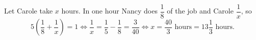 Let Carole take $x$ hours. In one hour Nancy does $\dfrac{1}{8}$ of the job and Carole $\dfrac{1}{x}$, so
\[
5\left(\dfrac{1}{8}+\dfrac{1}{x}\right)=1\iff\dfrac{1}{x}=\dfrac{1}{5}-\dfrac{1}{8}=\dfrac{3}{40}\iff x=\boxed{\dfrac{40}{3}}\text{ hours}=13\dfrac{1}{3}\text{ hours}.
\]
